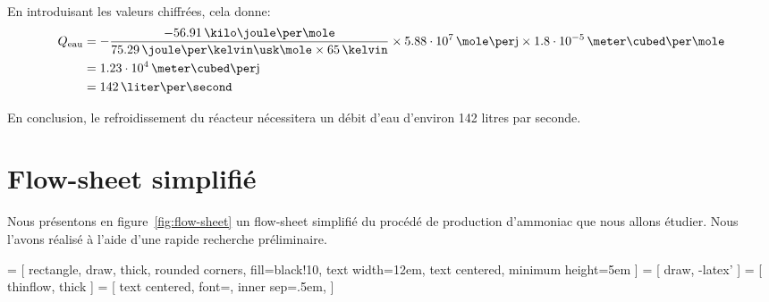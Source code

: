 \documentclass[a4paper,12pt]{article}
\begin{document}
En introduisant les valeurs chiffrées, cela donne:
\begin{align*}
    Q\ind{eau} &=
    -\frac{-56.91\,\kilo\joule\per\mole}{75.29\,\joule\per\kelvin\usk\mole
    \times 65\,\kelvin} \times 5.88\cdot10^7\,\mole\per\mbox{j}
    \times 1.8\cdot10^{-5}\,\meter\cubed\per\mole \\
    &= 1.23\cdot10^4\,\meter\cubed\per\mbox{j} \\
    &= 142\,\liter\per\second \\
\end{align*}

En conclusion, le refroidissement du réacteur nécessitera un débit d'eau
d'environ 142 litres par seconde.

\section{Flow-sheet simplifié}

Nous présentons en figure~\ref{fig:flow-sheet} un flow-sheet simplifié
du procédé de production d'ammoniac que nous allons étudier.
Nous l'avons réalisé à l'aide d'une rapide recherche préliminaire.

 = [
    rectangle, draw, thick, rounded corners, fill=black!10,
    text width=12em, text centered,
    minimum height=5em
]
 = [
    draw, -latex'
]
 = [
    thinflow, thick
]
 = [
    text centered,
    font=\footnotesize,
    inner sep=.5em,
]
\end{document}
